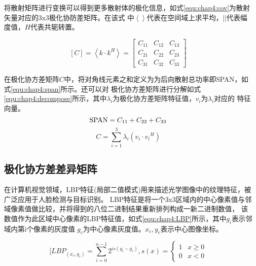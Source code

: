     将散射矩阵进行变换可以得到更多散射体的极化信息，如式\ref{equ:chap4:cov}为散射矢量对应的3x3极化协防差矩阵。在该式
    中$\left\langle {} \right\rangle$代表在空间域上求平均，$\left| {} \right|$代表幅度值，$H$代表共轭转置。

    \begin{equation}
        \label{equ:chap4:cov}
        [C] = \left\langle {k \cdot {k^H}} \right\rangle  = \left[ {\begin{array}{*{20}{c}}
        {{C_{11}}}&{{C_{12}}}&{{C_{13}}}\\
        {{C_{21}}}&{{C_{22}}}&{{C_{23}}}\\
        {{C_{31}}}&{{C_{32}}}&{{C_{33}}}
        \end{array}} \right]
    \end{equation}

    在极化协方差矩阵$C$中，将对角线元素之和定义为为后向散射总功率即SPAN，如式\ref{equ:chap4:span}所示。还可以对
    极化协方差矩阵进行分解如式\ref{equ:chap4:decompose}所示，其中$\lambda_i$为极化协方差矩阵特征值，$v_i$为$\lambda_i$对应的
    特征向量。
    \begin{equation}
        \label{equ:chap4:span}
        {\rm{SPAN}} = {C_{11}} + {C_{22}} + {C_{33}}
    \end{equation}
    \begin{equation}
        \label{equ:chap4:decompose}
      C = \sum\limits_{i = 1}^3 {{\lambda _i}({v_i} \cdot {v_i}^H)} 
    \end{equation}

    \subsection{极化协方差差异矩阵}
    在计算机视觉领域，LBP特征(局部二值模式)用来描述光学图像中的纹理特征，被广泛应用于人脸检测与目标识别。
    LBP特征是将一个3x3区域内的中心像素值与邻域像素值做比较，并将得到的八位二进制结果重新排列构成一新二进制数值，
    该数值作为此区域中心像素的LBP特征值，如式\ref{equ:chap4:LBP}所示，其中$g_i$表示邻域内第i个像素的灰度值
    $g_c$为中心像素灰度值。$x_c, y_c$表示中心图像坐标。

    \begin{equation}
        \label{equ:chap4:LBP}
        [LB{P_{({x_c},{y_c})}} = \sum\limits_{i = 0}^{n - 1} {{2^{is({g_i} - {g_c})}}} ,s(x) = \left\{ {\begin{array}{*{20}{c}}
        1&{x \ge 0}\\
        0&{x < 0}
        \end{array}} \right.
    \end{equation}

